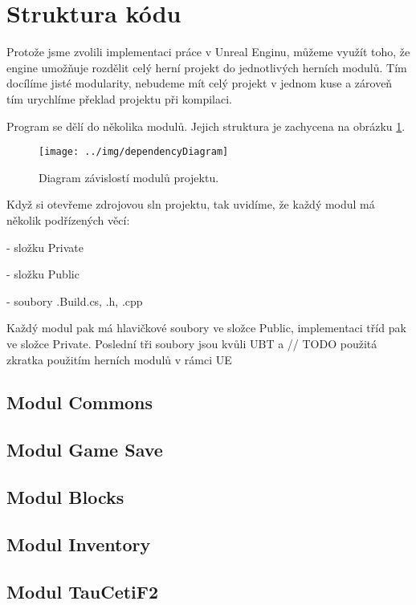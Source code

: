 
\section{Struktura kódu}

Protože jsme zvolili implementaci práce v Unreal Enginu, můžeme využít toho, že engine umožňuje rozdělit celý herní projekt do jednotlivých herních modulů\citep{epicGameplayModules}. Tím docílíme jisté modularity, nebudeme mít celý projekt v jednom kuse a zároveň tím urychlíme překlad projektu při kompilaci.

Program se dělí do několika modulů. Jejich struktura je zachycena na obrázku \ref{fig:obrStruktura_DependencyDiag}.

\begin{figure}[h!]\centering
\texttt{[image: ../img/dependencyDiagram]}

\caption{Diagram závislostí modulů projektu.}
\label{fig:obrStruktura_DependencyDiag}

\end{figure}

Když si otevřeme zdrojovou sln projektu, tak uvidíme, že každý modul má několik podřízených věcí: 

- složku Private

- složku Public

- soubory .Build.cs, .h, .cpp

Každý modul pak má hlavičkové soubory ve složce Public, implementaci tříd pak ve složce Private. Poslední tři soubory jsou kvůli UBT a // TODO použitá zkratka 
použitím herních modulů v rámci UE



\subsection{Modul Commons}



\subsection{Modul Game Save}



\subsection{Modul Blocks}



\subsection{Modul Inventory}



\subsection{Modul TauCetiF2}





